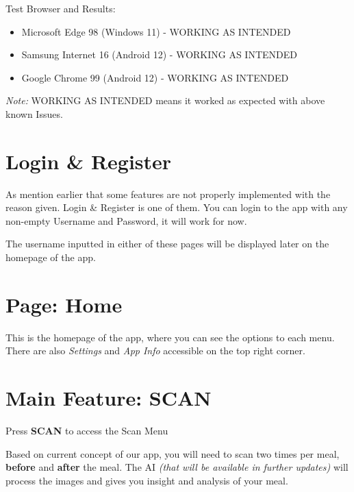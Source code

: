 \documentclass[a4paper,12pt]{article}
\begin{document}
\noindent
Test Browser and Results:
\begin{itemize}
    \item Microsoft Edge 98 (Windows 11) - WORKING AS INTENDED
    \item Samsung Internet 16 (Android 12) - WORKING AS INTENDED
    \item Google Chrome 99  (Android 12) - WORKING AS INTENDED
\end{itemize}

\noindent
\textit{Note:} WORKING AS INTENDED means it worked as expected with above known Issues.

\pagebreak
\section{Login \& Register}


As mention earlier that some features are not properly implemented with the reason given.
Login \& Register is one of them. You can login to the app with any non-empty Username and
Password, it will work for now.

The username inputted in either of these pages will be displayed later on
the homepage of the app.

\pagebreak
\section{Page: Home}


This is the homepage of the app, where you can see the options to each menu.
There are also \textit{Settings} and \textit{App Info} accessible on the top right corner.

\pagebreak
\section{Main Feature: SCAN}

Press \textbf{SCAN} to access the Scan Menu


Based on current concept of our app, you will need to scan two times per meal,
\textbf{before} and \textbf{after} the meal.
The AI \textit{(that will be available in further updates)} will process
the images and gives you insight and analysis of your meal.
\end{document}
